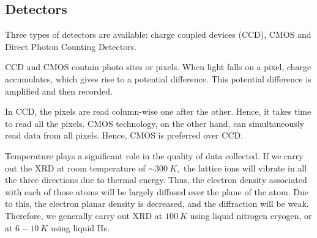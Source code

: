 \subsection{Detectors}

Three types of detectors are available: charge coupled devices (CCD), CMOS and Direct Photon Counting Detectors.

CCD and CMOS contain photo sites or pixels. When light falls on a pixel, charge accumulates, which gives rise to a potential difference. This potential difference is amplified and then recorded.

In CCD, the pixels are read column-wise one after the other. Hence, it takes time to read all the pixels. CMOS technology, on the other hand, can simultaneously read data from all pixels. Hence, CMOS is preferred over CCD.

Temperature plays a significant role in the quality of data collected. If we carry out the XRD at room temperature of $\sim \SI{300}{K},$ the lattice ions will vibrate in all the three directions due to thermal energy. Thus, the electron density associated with each of those atoms will be largely diffused over the plane of the atom. Due to this, the electron planar density is decreased, and the diffraction will be weak. Therefore, we generally carry out XRD at $\SI{100}{K}$ using liquid nitrogen cryogen, or at $6-10~\si{K}$ using liquid He.